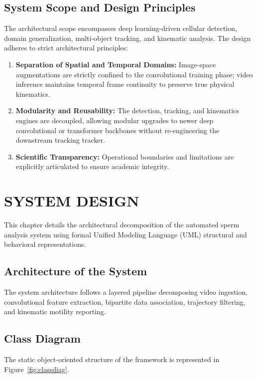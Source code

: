 \documentclass[12pt,a4paper]{report}
\begin{document}
\section{System Scope and Design Principles}
The architectural scope encompasses deep learning-driven cellular detection, domain generalization, multi-object tracking, and kinematic analysis. The design adheres to strict architectural principles:
\begin{enumerate}
    \item \textbf{Separation of Spatial and Temporal Domains:} Image-space augmentations are strictly confined to the convolutional training phase; video inference maintains temporal frame continuity to preserve true physical kinematics.
    \item \textbf{Modularity and Reusability:} The detection, tracking, and kinematics engines are decoupled, allowing modular upgrades to newer deep convolutional or transformer backbones without re-engineering the downstream tracking tracker.
    \item \textbf{Scientific Transparency:} Operational boundaries and limitations are explicitly articulated to ensure academic integrity.
\end{enumerate}

\chapter{SYSTEM DESIGN}

This chapter details the architectural decomposition of the automated sperm analysis system using formal Unified Modeling Language (UML) structural and behavioral representations.

\section{Architecture of the System}
The system architecture follows a layered pipeline decomposing video ingestion, convolutional feature extraction, bipartite data association, trajectory filtering, and kinematic motility reporting.

\section{Class Diagram}
The static object-oriented structure of the framework is represented in Figure~\ref{fig:classdiag}.
\end{document}
